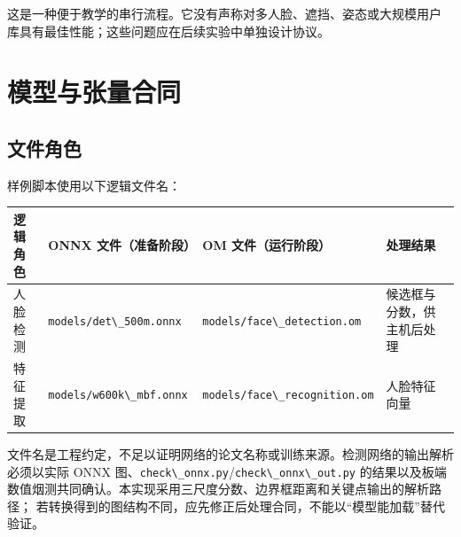 这是一种便于教学的串行流程。它没有声称对多人脸、遮挡、姿态或大规模用户
库具有最佳性能；这些问题应在后续实验中单独设计协议。

\section{模型与张量合同}\label{ux6a21ux578bux4e0eux5f20ux91cfux5408ux540c}

\subsection{文件角色}\label{ux6587ux4ef6ux89d2ux8272}

样例脚本使用以下逻辑文件名：

\begin{longtable}[]{@{}
  >{\raggedright\arraybackslash}p{}
  >{\raggedright\arraybackslash}p{}
  >{\raggedright\arraybackslash}p{}
  >{\raggedright\arraybackslash}p{}@{}}
\toprule\noalign{}
\begin{minipage}[b]{\linewidth}\raggedright
逻辑角色
\end{minipage} & \begin{minipage}[b]{\linewidth}\raggedright
ONNX 文件（准备阶段）
\end{minipage} & \begin{minipage}[b]{\linewidth}\raggedright
OM 文件（运行阶段）
\end{minipage} & \begin{minipage}[b]{\linewidth}\raggedright
处理结果
\end{minipage} \\
\midrule\noalign{}
\endhead
\bottomrule\noalign{}
\endlastfoot
人脸检测 & \passthrough{\lstinline!models/det\_500m.onnx!} &
\passthrough{\lstinline!models/face\_detection.om!} &
候选框与分数，供主机后处理 \\
特征提取 & \passthrough{\lstinline!models/w600k\_mbf.onnx!} &
\passthrough{\lstinline!models/face\_recognition.om!} & 人脸特征向量 \\
\end{longtable}

文件名是工程约定，不足以证明网络的论文名称或训练来源。检测网络的输出解析
必须以实际 ONNX
图、\passthrough{\lstinline!check\_onnx.py!}/\passthrough{\lstinline!check\_onnx\_out.py!}
的结果以及板端
数值烟测共同确认。本实现采用三尺度分数、边界框距离和关键点输出的解析路径；
若转换得到的图结构不同，应先修正后处理合同，不能以``模型能加载''替代验证。

